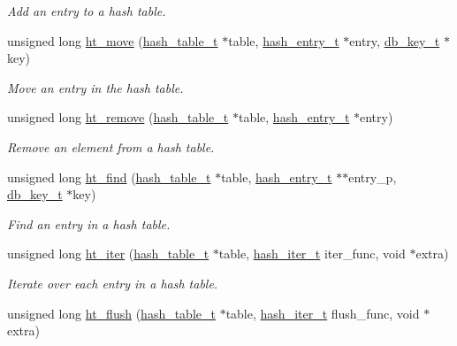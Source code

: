 \begin{CompactItemize}
\begin{CompactList}\small\item\em Add an entry to a hash table. \item\end{CompactList}\item 
unsigned long \hyperlink{group__dbprim__hash_ga12}{ht\_\-move} (\hyperlink{struct__hash__table__s}{hash\_\-table\_\-t} $\ast$table, \hyperlink{struct__hash__entry__s}{hash\_\-entry\_\-t} $\ast$entry, \hyperlink{struct__db__key__s}{db\_\-key\_\-t} $\ast$key)
\begin{CompactList}\small\item\em Move an entry in the hash table. \item\end{CompactList}\item 
unsigned long \hyperlink{group__dbprim__hash_ga13}{ht\_\-remove} (\hyperlink{struct__hash__table__s}{hash\_\-table\_\-t} $\ast$table, \hyperlink{struct__hash__entry__s}{hash\_\-entry\_\-t} $\ast$entry)
\begin{CompactList}\small\item\em Remove an element from a hash table. \item\end{CompactList}\item 
unsigned long \hyperlink{group__dbprim__hash_ga14}{ht\_\-find} (\hyperlink{struct__hash__table__s}{hash\_\-table\_\-t} $\ast$table, \hyperlink{struct__hash__entry__s}{hash\_\-entry\_\-t} $\ast$$\ast$entry\_\-p, \hyperlink{struct__db__key__s}{db\_\-key\_\-t} $\ast$key)
\begin{CompactList}\small\item\em Find an entry in a hash table. \item\end{CompactList}\item 
unsigned long \hyperlink{group__dbprim__hash_ga15}{ht\_\-iter} (\hyperlink{struct__hash__table__s}{hash\_\-table\_\-t} $\ast$table, \hyperlink{group__dbprim__hash_ga3}{hash\_\-iter\_\-t} iter\_\-func, void $\ast$extra)
\begin{CompactList}\small\item\em Iterate over each entry in a hash table. \item\end{CompactList}\item 
unsigned long \hyperlink{group__dbprim__hash_ga16}{ht\_\-flush} (\hyperlink{struct__hash__table__s}{hash\_\-table\_\-t} $\ast$table, \hyperlink{group__dbprim__hash_ga3}{hash\_\-iter\_\-t} flush\_\-func, void $\ast$extra)
$$
\end{CompactItemize}

